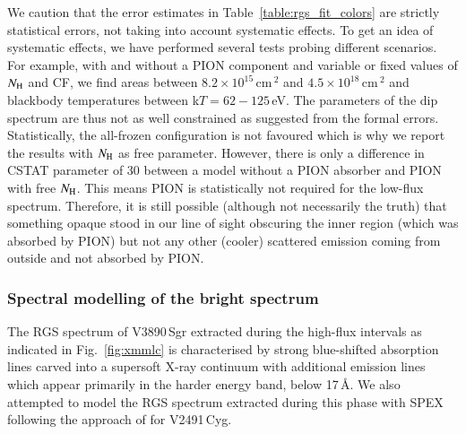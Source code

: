 \documentclass{aa}
\begin{document}
We caution that the error estimates in Table~\ref{table:rgs_fit_colors} are
strictly statistical errors, not taking into account systematic effects.
To get an idea of systematic effects, we have performed several tests
probing different scenarios. For example, with and without a {\scriptsize{PION}}
component and variable or fixed values of $N_{\rm H}$ and CF, we find
areas between $8.2\times 10^{15}$\,cm\,$^2$ and  $4.5\times 10^{18}$\,cm\,$^2$
and blackbody temperatures between k$T=62-125$\,eV. The parameters of the dip
spectrum are thus not as well constrained as suggested from the formal errors.
Statistically, the all-frozen configuration is not favoured which is why we report
the results with $N_{\rm H}$ as free parameter. However, there is only a difference
in {\scriptsize{CSTAT}} parameter
of 30 between a model without a {\scriptsize{PION}} absorber and {\scriptsize{PION}} 
with free $N_{\rm H}$. This means {\scriptsize{PION}} is statistically not required for the
low-flux spectrum. Therefore, it is still possible (although not necessarily the truth)
that something opaque stood in our line of sight obscuring the inner region (which was
absorbed by {\scriptsize{PION}}) but not any other (cooler) scattered emission coming from
outside and not absorbed by {\scriptsize{PION}}.


\subsubsection{Spectral modelling of the bright spectrum}
\label{sect:analysis:spexbright}

The RGS spectrum of V3890\,Sgr extracted during the high-flux intervals as indicated
in Fig.~\ref{fig:xmmlc} is characterised
by strong blue-shifted absorption lines carved into a supersoft X-ray continuum with
additional emission lines which appear primarily in the harder energy band, below
17\,{\AA}. We also attempted to model the RGS spectrum extracted during this phase with
SPEX following the approach of \cite{pinto12} for V2491\,Cyg.
\end{document}

